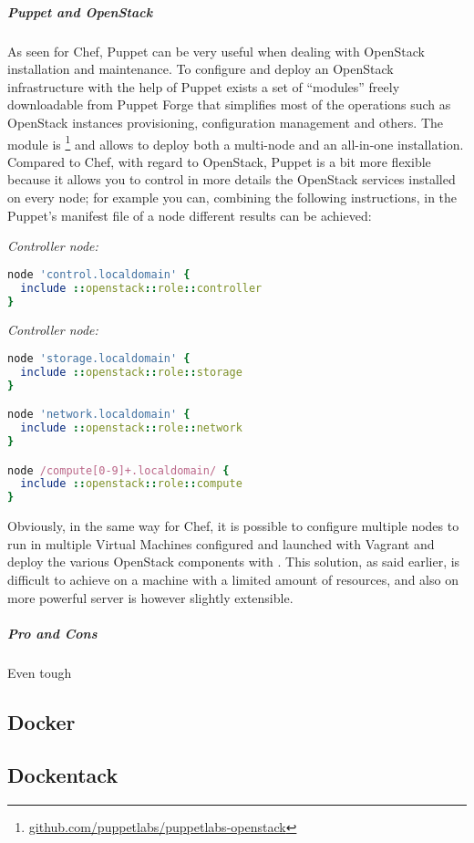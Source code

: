 \subparagraph{Puppet and OpenStack}
\label{subp:sota_puppet_openstack}

As seen for Chef, Puppet can be very useful when dealing with OpenStack installation and maintenance. To configure and deploy an OpenStack infrastructure with the help of Puppet exists a set of ``modules'' freely downloadable from Puppet Forge that simplifies most of the operations such as OpenStack instances provisioning, configuration management and others.
The module is \footnote{\url{github.com/puppetlabs/puppetlabs-openstack}} and allows to deploy both a multi-node and an all-in-one installation. Compared to Chef, with regard to OpenStack, Puppet is a bit more flexible because it allows you to control in more details the OpenStack services installed on every node; for example you can, combining the following instructions, in the Puppet's manifest file of a node different results can be achieved:

\textit{Controller node:}
\begin{lstlisting}[language=Ruby]
node 'control.localdomain' {
  include ::openstack::role::controller
}
\end{lstlisting}

\textit{Controller node:}
\begin{lstlisting}[language=Ruby]
node 'storage.localdomain' {
  include ::openstack::role::storage
}

node 'network.localdomain' {
  include ::openstack::role::network
}

node /compute[0-9]+.localdomain/ {
  include ::openstack::role::compute
}
\end{lstlisting}

Obviously, in the same way for Chef, it is possible to configure multiple nodes to run in multiple Virtual Machines configured and launched with Vagrant and deploy the various OpenStack components with . This solution, as said earlier, is difficult to achieve on a machine with a limited amount of resources, and also on more powerful server is however slightly extensible.

\subparagraph{Pro and Cons}
\label{subp:sota_puppet_pro_cons}
Even tough 

\subsection{Docker}
\label{sub:sota_docker}

\subsection{Dockentack}
\label{sub:sota_dockenstack}

